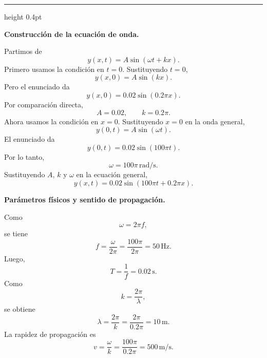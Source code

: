 \documentclass[11pt]{article}
\newcommand{\soluciontitulo}{%
  \par\medskip
  \noindent{\large\bfseries Solución.}\par
  \vspace{0.2em}\hrule height 0.4pt \vspace{0.7em}%
}
\newcommand{\paso}[1]{%
  \par\medskip
  \noindent\textbf{#1}\par
  \vspace{0.1em}%
}
\begin{document}
\soluciontitulo

\paso{Construcci\'on de la ecuaci\'on de onda.}
Partimos de
\begin{equation*}
    y(x,t)=A\sin(\omega t+kx).
\end{equation*}
Primero usamos la condici\'on en $t=0$. Sustituyendo $t=0$,
\begin{equation*}
    y(x,0)=A\sin(kx).
\end{equation*}
Pero el enunciado da
\begin{equation*}
    y(x,0)=0.02\sin(0.2\pi x).
\end{equation*}
Por comparaci\'on directa,
\begin{equation*}
    A=0.02,
    \qquad
    k=0.2\pi.
\end{equation*}
Ahora usamos la condici\'on en $x=0$. Sustituyendo $x=0$ en la onda general,
\begin{equation*}
    y(0,t)=A\sin(\omega t).
\end{equation*}
El enunciado da
\begin{equation*}
    y(0,t)=0.02\sin(100\pi t).
\end{equation*}
Por lo tanto,
\begin{equation*}
    \omega=100\pi\,\mathrm{rad/s}.
\end{equation*}
Sustituyendo $A$, $k$ y $\omega$ en la ecuaci\'on general,
\begin{equation*}
    \boxed{y(x,t)=0.02\sin(100\pi t+0.2\pi x)}.
\end{equation*}

\paso{Par\'ametros f\'isicos y sentido de propagaci\'on.}
Como
\begin{equation*}
    \omega=2\pi f,
\end{equation*}
se tiene
\begin{equation*}
    f=\frac{\omega}{2\pi}=\frac{100\pi}{2\pi}=50\,\mathrm{Hz}.
\end{equation*}
Luego,
\begin{equation*}
    T=\frac{1}{f}=0.02\,\mathrm{s}.
\end{equation*}
Como
\begin{equation*}
    k=\frac{2\pi}{\lambda},
\end{equation*}
se obtiene
\begin{equation*}
    \lambda=\frac{2\pi}{k}=\frac{2\pi}{0.2\pi}=10\,\mathrm{m}.
\end{equation*}
La rapidez de propagaci\'on es
\begin{equation*}
    v=\frac{\omega}{k}=\frac{100\pi}{0.2\pi}=500\,\mathrm{m/s}.
\end{equation*}
\end{document}
